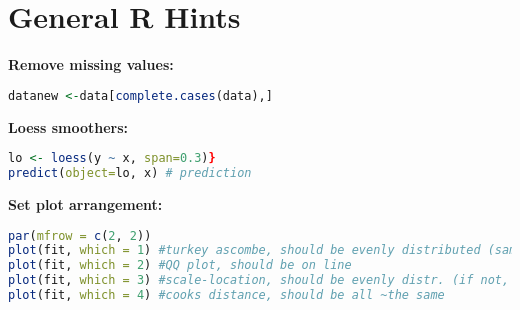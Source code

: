 \section{General R Hints}
\textbf{Remove missing values: }
\begin{lstlisting}[language = R]
datanew <-data[complete.cases(data),]
\end{lstlisting}
\textbf{Loess smoothers: } 
\begin{lstlisting}[language = R]
lo <- loess(y ~ x, span=0.3)}
predict(object=lo, x) # prediction
\end{lstlisting}
\textbf{Set plot arrangement:}
\begin{lstlisting}[language = R]
par(mfrow = c(2, 2))
plot(fit, which = 1) #turkey ascombe, should be evenly distributed (same amount positive and negative->otherwise not normally distributed, straight lane ->otherwise expected value depends on x, if eg. beginning all dots close to line and end not, it's non constant variance)
plot(fit, which = 2) #QQ plot, should be on line
plot(fit, which = 3) #scale-location, should be evenly distr. (if not, no heteroscedasticity)
plot(fit, which = 4) #cooks distance, should be all ~the same
\end{lstlisting}